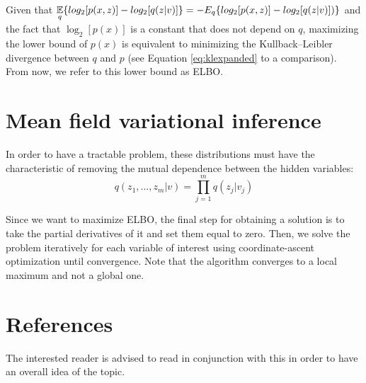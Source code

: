 Given that $ \displaystyle \operatorname*{\mathbb{E}}_q \{log_2[p(x,z)] - log_2[q(z | v)]\} = - E_q \{ log_2[p(x,z)] -log_2[q(z | v)]) \}$
and the fact that $\log_2[p(x)]$ is a constant that does not depend on $q$,
maximizing the lower bound of $p(x)$ is equivalent to minimizing the Kullback–Leibler divergence between $q$ and $p$ (see Equation \ref{eq:klexpanded} to a comparison).
From now, we refer to this lower bound as ELBO.

\section{Mean field variational inference}
In order to have a tractable problem, these distributions must have the characteristic
of removing the mutual dependence between the hidden variables:
$$ q(z_1, ..., z_m| v) = \prod_{j=1}^m q(z_j | v_j) $$

Since we want to maximize ELBO,
the final step for obtaining a solution is to take the partial derivatives of it and set them equal to zero.
Then, we solve the problem iteratively for each variable of interest using coordinate-ascent optimization until convergence.
Note that the algorithm converges to a local maximum and not a global one.

\section{References}
The interested reader is advised to read \cite{Blei_2017} in conjunction with this in order to have an overall idea of the topic.